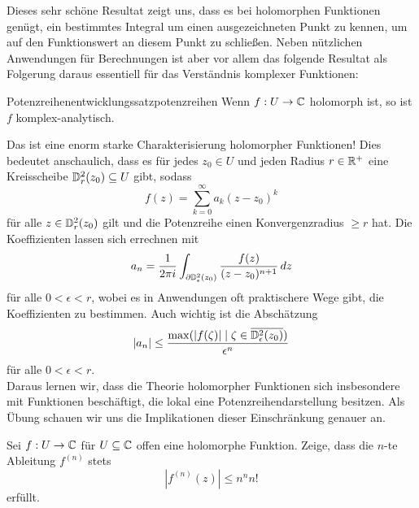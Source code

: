 Dieses sehr schöne Resultat zeigt uns, dass es bei holomorphen Funktionen genügt, ein bestimmtes Integral um einen ausgezeichneten Punkt zu kennen, um auf den Funktionswert an diesem Punkt zu schließen. Neben nützlichen Anwendungen für Berechnungen ist aber vor allem das folgende Resultat als Folgerung daraus essentiell für das Verständnis komplexer Funktionen:
\begin{theorem}{Potenzreihenentwicklungssatz}{potenzreihen}
Wenn $f: U \to \mathbb{C}$ holomorph ist, so ist $f$ komplex-analytisch.
\end{theorem}
Das ist eine enorm starke Charakterisierung holomorpher Funktionen! Dies bedeutet anschaulich, dass es für jedes $z_0 \in U$ und jeden Radius $r \in \mathbb{R}^+$ eine Kreisscheibe $\mathbb{D}^2_r(z_0) \subseteq U$ gibt, sodass
\begin{equation}
f(z)=\sum_{k=0}^\infty a_k(z-z_0)^k
\end{equation}
für alle $z \in \mathbb{D}^2_r(z_0)$ gilt und die Potenzreihe einen Konvergenzradius $\geq r$ hat. Die Koeffizienten lassen sich errechnen mit 
\begin{equation}
a_n = \frac{1}{2 \pi i} \int_{\partial \mathbb{D}^2_\epsilon(z_0)} \frac{f(z)}{(z-z_0)^{n+1}} \, dz
\end{equation}
für alle $0<\epsilon<r$, wobei es in Anwendungen oft praktischere Wege gibt, die Koeffizienten zu bestimmen. Auch wichtig ist die Abschätzung
\begin{equation}
\label{eq:koef}
|a_n| \leq \frac{\max(|f(\zeta)| \mid \zeta \in \overline{\mathbb{D}^2_\epsilon(z_0)})}{\epsilon^n}
\end{equation}
für alle $0<\epsilon<r$.\\
Daraus lernen wir, dass die Theorie holomorpher Funktionen sich insbesondere mit Funktionen beschäftigt, die lokal eine Potenzreihendarstellung besitzen. Als Übung schauen wir uns die Implikationen dieser Einschränkung genauer an.
\begin{übung}
Sei $f: U \to \mathbb{C}$ für $U \subseteq \mathbb{C}$ offen eine holomorphe Funktion. Zeige, dass die $n$-te Ableitung $f^{(n)}$ stets
\begin{equation}
|f^{(n)}(z)| \leq n^n n!
\end{equation}
erfüllt.
\end{übung}
